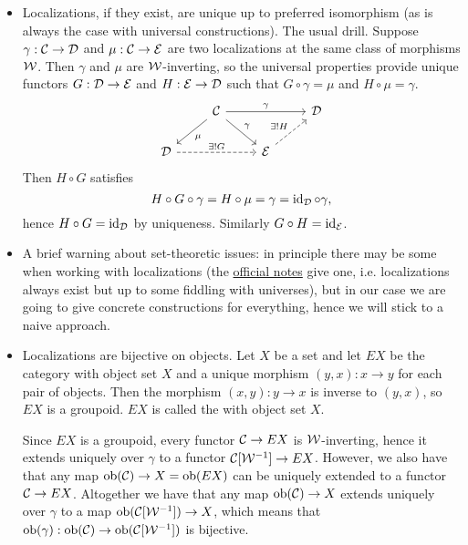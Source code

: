 \begin{itemize}[label={-}]
    \item Localizations, if they exist, are unique up to preferred isomorphism (as is always the case with universal constructions). The usual drill. Suppose $\gamma:\mathcal{C}\to\mathcal{D}$ and $\mu:\mathcal{C}\to\mathcal{E}$ are two localizations at the same class of morphisms $\mathcal{W}$. Then $\gamma$ and $\mu$ are $\mathcal{W}$-inverting, so the universal properties provide unique functors $G:\mathcal{D}\to\mathcal{E}$ and $H:\mathcal{E}\to\mathcal{D}$ such that $G\circ\gamma=\mu$ and $H\circ\mu=\gamma$.
    \[
    \begin{tikzcd}
     & \Cc \ar[dr,"\gamma"] \ar[dl,"\mu"] \ar[rr,"\gamma"] & & \Dd\\
     \Dd \ar[rr,dashed,"\exists!G"] & & \Ee \ar[ur,dashed,"\exists!H"] &
    \end{tikzcd}
    \]
    Then $H\circ G$ satisfies
    \[H\circ G\circ\gamma=H\circ\mu=\gamma=\operatorname{id}_{\mathcal{D}}\circ\gamma,\]
    hence $H\circ G=\operatorname{id}_{\mathcal{D}}$ by uniqueness. Similarly $G\circ H=\operatorname{id}_{\mathcal{E}}$.
    
    \item A brief warning about set-theoretic issues: in principle there may be some when working with localizations (the \href{https://www.math.uni-bonn.de/people/schwede/sset_vs_spaces.pdf}{official notes} give one, i.e. localizations always exist but up to some fiddling with universes), but in our case we are going to give concrete constructions for everything, hence we will stick to a naive approach.
    
    \item Localizations are bijective on objects. Let $X$ be a set and let $EX$ be the category with object set $X$ and a unique morphism $(y,x):x\to y$ for each pair of objects. Then the morphism $(x,y):y\to x$ is inverse to $(y,x)$, so $EX$ is a groupoid. $EX$ is called the  with object set $X$.
    
    Since $EX$ is a groupoid, every functor $\mathcal{C}\to EX$ is $\mathcal{W}$-inverting, hence it extends uniquely over $\gamma$ to a functor $\mathcal{C}[\mathcal{W}^{-1}]\to EX$. However, we also have that any map $\operatorname{ob}(\mathcal{C})\to X=\operatorname{ob}(EX)$ can be uniquely extended to a functor $\mathcal{C}\to EX$. Altogether we have that any map $\operatorname{ob}(\mathcal{C})\to X$ extends uniquely over $\gamma$ to a map $\operatorname{ob}(\mathcal{C}[\mathcal{W}^{-1}])\to X$, which means that $\operatorname{ob}(\gamma):\operatorname{ob}(\mathcal{C})\to\operatorname{ob}(\mathcal{C}[\mathcal{W}^{-1}])$ is bijective.
    

\end{itemize}
